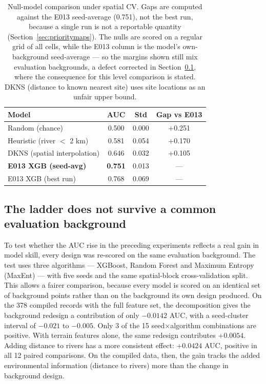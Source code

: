\documentclass[12pt]{article}
\begin{document}
\begin{table}[h]
\centering
\small
\begin{tabular}{lccc}
\toprule
Model & AUC & Std & Gap vs E013 \\
\midrule
Random (chance)              & 0.500 & 0.000 & $+$0.251 \\
Heuristic (river $<$ 2 km)   & 0.581 & 0.054 & $+$0.170 \\
DKNS (spatial interpolation) & 0.646 & 0.032 & $+$0.105 \\
\textbf{E013 XGB (seed-avg)} & \textbf{0.751} & 0.013 & --- \\
E013 XGB (best run)          & 0.768 & 0.069 & --- \\
\bottomrule
\end{tabular}
\caption{Null-model comparison under spatial CV. Gaps are computed against the E013 seed-average (0.751), not the best run, because a single run is not a reportable quantity (Section~\ref{sec:prioritymaps}). The nulls are scored on a regular grid of all cells, while the E013 column is the model's own-background seed-average --- so the margins shown still mix evaluation backgrounds, a defect corrected in Section~\ref{sec:artefact}, where the consequence for this level comparison is stated. DKNS (distance to known nearest site) uses site locations as an unfair upper bound.}
\label{tab:nullmodel}
\end{table}

\subsection{The ladder does not survive a common evaluation background}
\label{sec:artefact}

To test whether the AUC rise in the preceding experiments reflects a real gain in model skill, every design was re-scored on the same evaluation background.
The test uses three algorithms --- XGBoost, Random Forest and Maximum Entropy (MaxEnt) --- with five seeds and the same spatial-block cross-validation split.
This allows a fairer comparison, because every model is scored on an identical set of background points rather than on the background its own design produced.
On the 378 compiled records with the full feature set, the decomposition gives the background redesign a contribution of only $-0.0142$ AUC, with a seed-cluster interval of $-0.021$ to $-0.005$.
Only 3 of the 15 seed$\times$algorithm combinations are positive.
With terrain features alone, the same redesign contributes $+0.0054$.
Adding distance to rivers has a more consistent effect: $+0.0424$ AUC, positive in all 12 paired comparisons.
On the compiled data, then, the gain tracks the added environmental information (distance to rivers) more than the change in background design.
\end{document}

